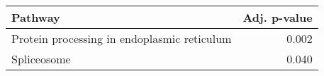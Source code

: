 \begin{tabular}{lr}
\toprule
                                     Pathway &  Adj. p-value \\
\midrule
 Protein processing in endoplasmic reticulum &         0.002 \\
                                 Spliceosome &         0.040 \\
\bottomrule
\end{tabular}
